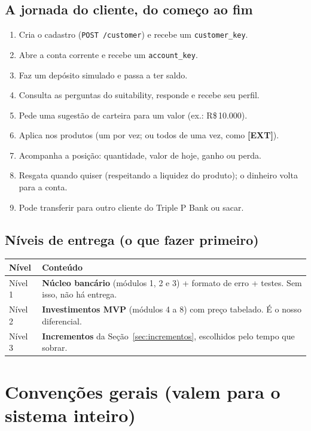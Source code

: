 \documentclass[11pt,a4paper]{article}
\newcommand{\banco}{Triple P Bank}            %
\newcommand{\ext}{\textbf{[EXT]}}          %
\newcommand{\rs}{R\$\,}
\newcommand{\tb}[1]{\texttt{#1}}           %
\begin{document}
\subsection{A jornada do cliente, do começo ao fim}

\begin{enumerate}
  \item Cria o cadastro (\tb{POST /customer}) e recebe um \tb{customer_key}.
  \item Abre a conta corrente e recebe um \tb{account_key}.
  \item Faz um depósito simulado e passa a ter saldo.
  \item Consulta as perguntas do suitability, responde e recebe seu perfil.
  \item Pede uma sugestão de carteira para um valor (ex.: \rs 10.000).
  \item Aplica nos produtos (um por vez; ou todos de uma vez, como \ext).
  \item Acompanha a posição: quantidade, valor de hoje, ganho ou perda.
  \item Resgata quando quiser (respeitando a liquidez do produto); o dinheiro volta para a conta.
  \item Pode transferir para outro cliente do \banco{} ou sacar.
\end{enumerate}

\subsection{Níveis de entrega (o que fazer primeiro)}

\begin{tabularx}{\linewidth}{@{}P{2.4cm}X@{}}
\toprule
\textbf{Nível} & \textbf{Conteúdo} \\
\midrule
Nível 1 & \textbf{Núcleo bancário} (módulos 1, 2 e 3) + formato de erro + testes. Sem isso, não há entrega. \\
Nível 2 & \textbf{Investimentos MVP} (módulos 4 a 8) com preço tabelado. É o nosso diferencial. \\
Nível 3 & \textbf{Incrementos} da Seção~\ref{sec:incrementos}, escolhidos pelo tempo que sobrar. \\
\bottomrule
\end{tabularx}

\section{Convenções gerais (valem para o sistema inteiro)}
\end{document}
